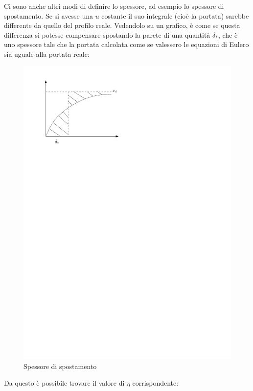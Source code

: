Ci sono anche altri modi di definire lo spessore, ad esempio lo spessore di spostamento.
Se si avesse una $u$ costante il suo integrale (cioè la portata) sarebbe differente da quello del profilo reale.
Vedendolo su un grafico, è come se questa differenza si potesse compensare spostando la parete di una quantità $\delta_*$, che è uno spessore tale che la portata calcolata come se valessero le equazioni di Eulero sia uguale alla portata reale:
	\begin{figure}[ht]
		\includegraphics[scale=0.7]{./7.4 Strato limite/7.4-7}
		\centering
		\caption{Spessore di spostamento}
	\end{figure}
%
Da questo è possibile trovare il valore di $\eta$ corrispondente:
